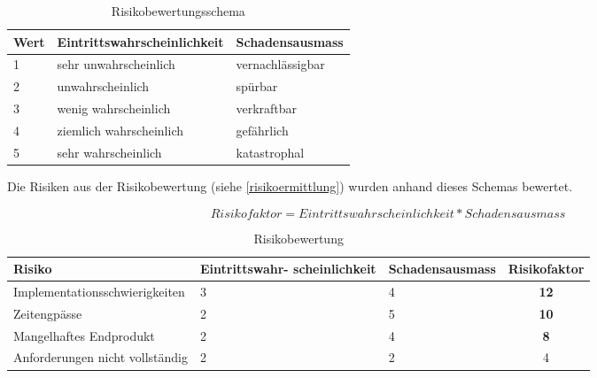 \begin{table}[ht]
\centering
  \begin{tabular}{ l | p{5cm} | p{5cm} }
	\hline
	\rowcolor{gray}
	\textbf{Wert}					&	\textbf{Eintrittswahrscheinlichkeit} &	\textbf{Schadensausmass}	\\ \hline			
	1							&	sehr unwahrscheinlich		&	vernachlässigbar	\\ \hline
	2							&	unwahrscheinlich			&	spürbar		\\ \hline
	3							&	wenig wahrscheinlich		&	verkraftbar		\\ \hline
	4							&	ziemlich wahrscheinlich		&	gefährlich		\\ \hline
	5							&	sehr wahrscheinlich			&	katastrophal		\\ \hline
  \end{tabular}
   \caption{Risikobewertungsschema}
\end{table}

\FloatBarrier
Die Risiken aus der Risikobewertung (siehe \ref{risikoermittlung}) wurden anhand dieses Schemas bewertet.

\begin{equation*}
Risikofaktor = Eintrittswahrscheinlichkeit * Schadensausmass
\end{equation*}

\begin{table}[ht]
\centering
  \begin{tabular}{ l | p{3cm} | p{3cm} | c }
	\hline
	\rowcolor{gray}
	\textbf{Risiko}					&	\textbf{Eintrittswahr- scheinlichkeit} &	\textbf{Schadensausmass} 	&	\textbf{Risikofaktor}\\ \hline			
	Implementationsschwierigkeiten			&	3					&	4			&	\textbf{12}	\\ \hline
	Zeitengpässe					&	2					&	5			&	\textbf{10}	\\ \hline
	Mangelhaftes Endprodukt				&	2					&	4			&	\textbf{8}	\\ \hline
	Anforderungen nicht vollständig			&	2					&	2			&	4		\\ \hline
  \end{tabular}
   \caption{Risikobewertung}
\end{table}


